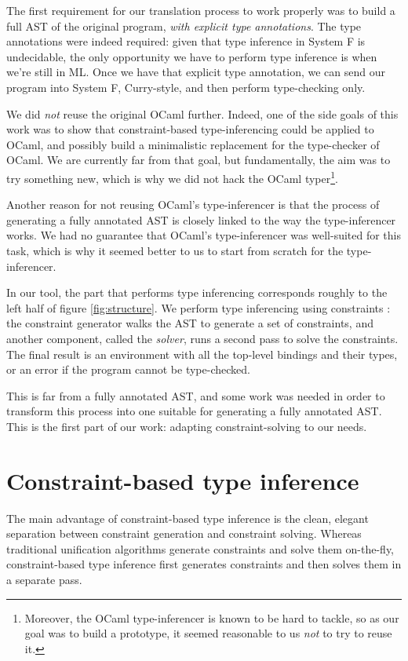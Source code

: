 \documentclass[10pt,a4paper,twoside,titlepage,twocolumn]{article}
\begin{document}
The first requirement for our translation process to work properly was to build
a full AST of the original program, \emph{with explicit type annotations}. The
type annotations were indeed required: given that type inference in System F is
undecidable, the only opportunity we have to perform type inference is when
we're still in ML. Once we have that explicit type annotation, we can send our
program into System F, Curry-style, and then perform type-checking only.

We did \emph{not} reuse the original OCaml further. Indeed, one of the side
goals of this work was to show that constraint-based type-inferencing could be
applied to OCaml, and possibly build a minimalistic replacement for the
type-checker of OCaml. We are currently far from that goal, but fundamentally,
the aim was to try something new, which is why we did not hack the OCaml
typer\footnote{Moreover, the OCaml type-inferencer is known to be hard to
tackle, so as our goal was to build a prototype, it seemed reasonable to us
\emph{not} to try to reuse it.}.

Another reason for not reusing OCaml's type-inferencer is that the process of
generating a fully annotated AST is closely linked to the way the type-inferencer
works. We had no guarantee that OCaml's type-inferencer was well-suited for this
task, which is why it seemed better to us to start from scratch for the
type-inferencer.

In our tool, the part that performs type inferencing corresponds roughly to the
left half of figure \ref{fig:structure}. We perform type inferencing using
constraints \cite{pottier2005essence}: the constraint generator walks the AST to
generate a set of constraints, and another component, called the \emph{solver},
runs a second pass to solve the constraints. The final result is an environment
with all the top-level bindings and their types, or an error if the program
cannot be type-checked.

This is far from a fully annotated AST, and some work was needed in order to
transform this process into one suitable for generating a fully annotated AST.
This is the first part of our work: adapting constraint-solving to our needs.

\section{Constraint-based type inference}

The main advantage of constraint-based type inference is the clean, elegant
separation between constraint generation and constraint solving. Whereas
traditional unification algorithms generate constraints and solve them
on-the-fly, constraint-based type inference first generates constraints and then
solves them in a separate pass.
\end{document}
